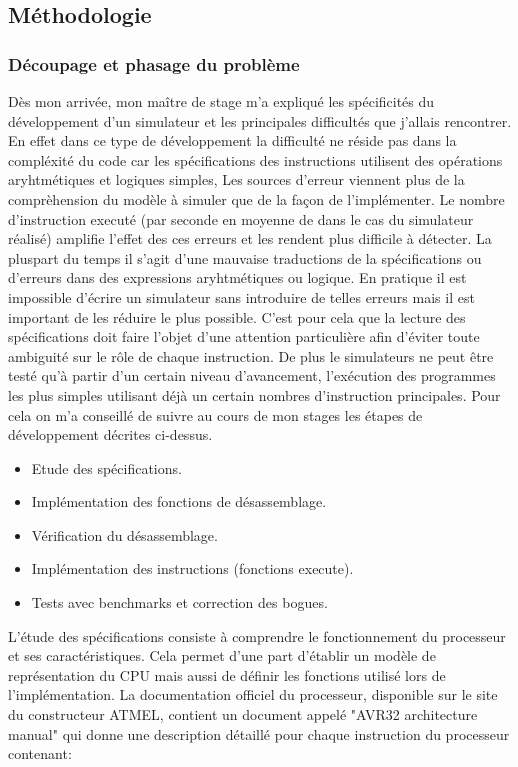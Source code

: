 \subsection{Méthodologie}

\subsubsection{Découpage et phasage du problème}
Dès mon arrivée, mon maître de stage m'a expliqué les spécificités du développement d'un simulateur et les principales difficultés que j'allais rencontrer. 
En effet dans ce type de développement la difficulté ne réside pas dans la compléxité du code car les spécifications des instructions utilisent des opérations aryhtmétiques et logiques simples,
Les sources d'erreur viennent plus de la comprèhension du modèle à simuler que de la façon de l'implémenter.
Le nombre d'instruction executé (par seconde en moyenne de dans le cas du simulateur réalisé) amplifie l'effet des ces erreurs et les rendent plus difficile à détecter. 
La pluspart du temps il s'agit d'une mauvaise traductions de la spécifications ou d'erreurs dans des expressions aryhtmétiques ou logique. 
En pratique il est impossible d'écrire un simulateur sans introduire de telles erreurs mais il est important de les réduire le plus possible.
C'est pour cela que la lecture des spécifications doit faire l'objet d'une attention particulière afin d'éviter toute ambiguité sur le rôle de chaque instruction. 
De plus le simulateurs ne peut être testé qu'à partir d'un certain niveau d'avancement, l'exécution des programmes les plus simples utilisant déjà un certain nombres d'instruction principales.
Pour cela on m'a conseillé de suivre au cours de mon stages les étapes de développement décrites ci-dessus.

\begin{itemize}
\item Etude des spécifications.
\item Implémentation des fonctions de désassemblage.
\item Vérification du désassemblage.
\item Implémentation des instructions (fonctions execute).
\item Tests avec benchmarks et correction des bogues.
\end{itemize}

L'étude des spécifications consiste à comprendre le fonctionnement du processeur et ses caractéristiques. 
Cela permet d'une part d'établir un modèle de représentation du CPU mais aussi de définir les fonctions utilisé lors de l'implémentation. 
La documentation officiel du processeur, disponible sur le site du constructeur ATMEL, contient un document appelé "AVR32 architecture manual" qui donne une description détaillé pour chaque instruction du processeur contenant:

